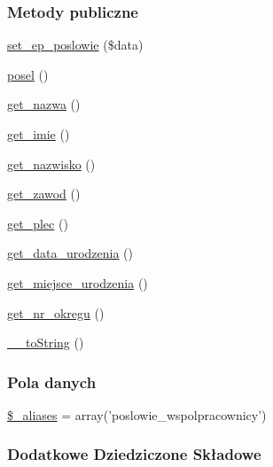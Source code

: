 \subsubsection*{Metody publiczne}
\begin{DoxyCompactItemize}
\item 
\hyperlink{classep___posel___wspolpracownik_a6a354494d54778bcc9254b5826b5f28c}{set\-\_\-ep\-\_\-poslowie} (\$data)
\item 
\hyperlink{classep___posel___wspolpracownik_ad3b9fc55831f7bcabb4870306bc08f4b}{posel} ()
\item 
\hyperlink{classep___posel___wspolpracownik_ac0818f0049d7b84f08f77128f54cee36}{get\-\_\-nazwa} ()
\item 
\hyperlink{classep___posel___wspolpracownik_ac4b0c85dc2a130038f2d118dbd0c3d77}{get\-\_\-imie} ()
\item 
\hyperlink{classep___posel___wspolpracownik_abdd1d7ff92508da7f748ba1feec97af0}{get\-\_\-nazwisko} ()
\item 
\hyperlink{classep___posel___wspolpracownik_af80ca8310b60004454dd02a387deaa2c}{get\-\_\-zawod} ()
\item 
\hyperlink{classep___posel___wspolpracownik_ac7f9af5c3fa024e4c26a7b6bd4ce4bb4}{get\-\_\-plec} ()
\item 
\hyperlink{classep___posel___wspolpracownik_a880b240cd2d8c336fd1709bf0cb1ae2c}{get\-\_\-data\-\_\-urodzenia} ()
\item 
\hyperlink{classep___posel___wspolpracownik_ac57c08ec5e394a19c5bd9280c8376182}{get\-\_\-miejsce\-\_\-urodzenia} ()
\item 
\hyperlink{classep___posel___wspolpracownik_a2645a9f0aa5b0ccc482943348c033d0a}{get\-\_\-nr\-\_\-okregu} ()
\item 
\hyperlink{classep___posel___wspolpracownik_a7516ca30af0db3cdbf9a7739b48ce91d}{\-\_\-\-\_\-to\-String} ()
\end{DoxyCompactItemize}
\subsubsection*{Pola danych}
\begin{DoxyCompactItemize}
\item 
\hyperlink{classep___posel___wspolpracownik_ab4e31d75f0bc5d512456911e5d01366b}{\$\-\_\-aliases} = array('poslowie\-\_\-wspolpracownicy')
\end{DoxyCompactItemize}
\subsubsection*{Dodatkowe Dziedziczone Składowe}


